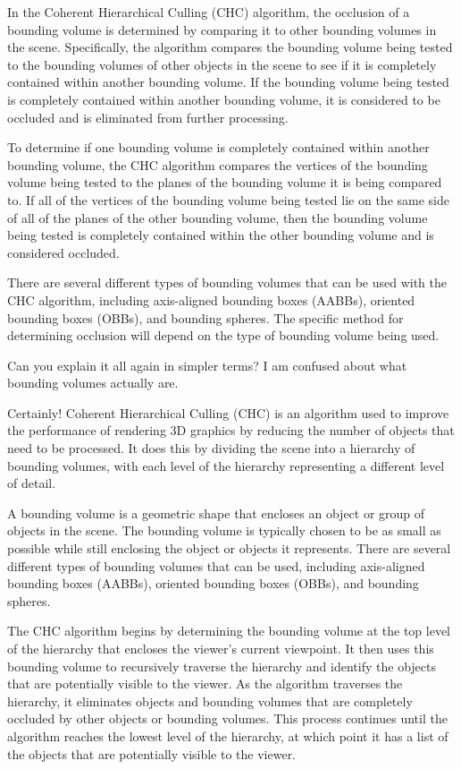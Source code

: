 \begin{description}
	\gpt In the Coherent Hierarchical Culling (CHC) algorithm, the occlusion of a bounding volume is determined by comparing it to other bounding volumes in the scene. Specifically, the algorithm compares the bounding volume being tested to the bounding volumes of other objects in the scene to see if it is completely contained within another bounding volume. If the bounding volume being tested is completely contained within another bounding volume, it is considered to be occluded and is eliminated from further processing.

	To determine if one bounding volume is completely contained within another bounding volume, the CHC algorithm compares the vertices of the bounding volume being tested to the planes of the bounding volume it is being compared to. If all of the vertices of the bounding volume being tested lie on the same side of all of the planes of the other bounding volume, then the bounding volume being tested is completely contained within the other bounding volume and is considered occluded.

	There are several different types of bounding volumes that can be used with the CHC algorithm, including axis-aligned bounding boxes (AABBs), oriented bounding boxes (OBBs), and bounding spheres. The specific method for determining occlusion will depend on the type of bounding volume being used.

	\me Can you explain it all again in simpler terms? I am confused about what bounding volumes actually are.

	\gpt Certainly! Coherent Hierarchical Culling (CHC) is an algorithm used to improve the performance of rendering 3D graphics by reducing the number of objects that need to be processed. It does this by dividing the scene into a hierarchy of bounding volumes, with each level of the hierarchy representing a different level of detail.

	A bounding volume is a geometric shape that encloses an object or group of objects in the scene. The bounding volume is typically chosen to be as small as possible while still enclosing the object or objects it represents. There are several different types of bounding volumes that can be used, including axis-aligned bounding boxes (AABBs), oriented bounding boxes (OBBs), and bounding spheres.

	The CHC algorithm begins by determining the bounding volume at the top level of the hierarchy that encloses the viewer's current viewpoint. It then uses this bounding volume to recursively traverse the hierarchy and identify the objects that are potentially visible to the viewer. As the algorithm traverses the hierarchy, it eliminates objects and bounding volumes that are completely occluded by other objects or bounding volumes. This process continues until the algorithm reaches the lowest level of the hierarchy, at which point it has a list of the objects that are potentially visible to the viewer.


\end{description}
